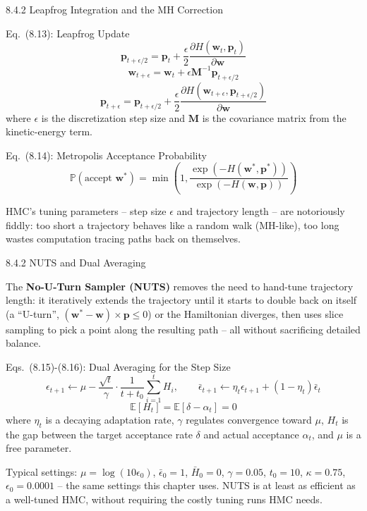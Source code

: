\documentclass[aspectratio=169,10pt]{beamer}
\begin{document}
\begin{frame}[allowframebreaks]{8.4.2 Leapfrog Integration and the MH Correction}

\begin{block}{Eq.\ (8.13): Leapfrog Update}
\[
\mathbf{p}_{t+\epsilon/2} = \mathbf{p}_t + \frac{\epsilon}{2}\frac{\partial H(\mathbf{w}_t,\mathbf{p}_t)}{\partial \mathbf{w}}
\]
\[
\mathbf{w}_{t+\epsilon} = \mathbf{w}_t + \epsilon \mathbf{M}^{-1}\mathbf{p}_{t+\epsilon/2}
\]
\[
\mathbf{p}_{t+\epsilon} = \mathbf{p}_{t+\epsilon/2} + \frac{\epsilon}{2}\frac{\partial H(\mathbf{w}_{t+\epsilon},\mathbf{p}_{t+\epsilon/2})}{\partial \mathbf{w}}
\]
where $\epsilon$ is the discretization step size and $\mathbf{M}$ is the covariance matrix from the kinetic-energy term.
\end{block}

\begin{block}{Eq.\ (8.14): Metropolis Acceptance Probability}
\[
\mathbb{P}(\text{accept } \mathbf{w}^*) = \min\left(1, \frac{\exp(-H(\mathbf{w}^*,\mathbf{p}^*))}{\exp(-H(\mathbf{w},\mathbf{p}))}\right)
\]
\end{block}
HMC's tuning parameters -- step size $\epsilon$ and trajectory length -- are notoriously fiddly: too short a trajectory behaves like a random walk (MH-like), too long wastes computation tracing paths back on themselves.

\end{frame}

\begin{frame}[allowframebreaks]{8.4.2 NUTS and Dual Averaging}

The \textbf{No-U-Turn Sampler (NUTS)} removes the need to hand-tune trajectory length: it iteratively extends the trajectory until it starts to double back on itself (a ``U-turn'', $(\mathbf{w}^*-\mathbf{w})\times\mathbf{p}\le 0$) or the Hamiltonian diverges, then uses slice sampling to pick a point along the resulting path -- all without sacrificing detailed balance.

\begin{block}{Eqs.\ (8.15)-(8.16): Dual Averaging for the Step Size}
\[
\epsilon_{t+1} \leftarrow \mu - \frac{\sqrt{t}}{\gamma}\cdot\frac{1}{t+t_0}\sum_{i=1}^{t} H_i, \qquad
\bar\epsilon_{t+1} \leftarrow \eta_t \epsilon_{t+1} + (1-\eta_t)\bar\epsilon_t
\]
\[
\mathbb{E}[H_t] = \mathbb{E}[\delta - \alpha_t] = 0
\]
where $\eta_t$ is a decaying adaptation rate, $\gamma$ regulates convergence toward $\mu$, $H_t$ is the gap between the target acceptance rate $\delta$ and actual acceptance $\alpha_t$, and $\mu$ is a free parameter.
\end{block}
Typical settings: $\mu=\log(10\epsilon_0)$, $\bar\epsilon_0=1$, $\bar H_0=0$, $\gamma=0.05$, $t_0=10$, $\kappa=0.75$, $\epsilon_0=0.0001$ -- the same settings this chapter uses. NUTS is at least as efficient as a well-tuned HMC, without requiring the costly tuning runs HMC needs.

\end{frame}
\end{document}

